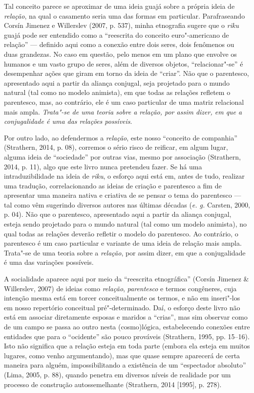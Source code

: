 Tal conceito parece se aproximar de uma ideia guajá sobre a própria
ideia de \emph{relação}, na qual o casamento seria uma das formas em
particular. Parafraseando Corsín Jimenez e Willerslev (2007, p. 537),
minha etnografia sugere que o \emph{riku} guajá pode ser entendido como
a ``reescrita do conceito euro"-americano de relação'' --- definido aqui como
a conexão entre dois seres, dois fenômenos ou duas grandezas. No caso em
questão, pelo menos em um plano que envolve os humanos e um vasto grupo
de seres, além de diversos objetos, ``relacionar"-se'' é desempenhar ações
que giram em torno da ideia de ``criar''. Não que o parentesco,
apresentado aqui a partir da aliança conjugal, seja projetado para o
mundo natural (tal como no modelo animista), em que todas as relações
refletem o parentesco, mas, ao contrário, ele é um caso particular de
uma matriz relacional mais ampla. \emph{Trata"-se de uma teoria sobre a
relação, por assim dizer, em que a conjugalidade é uma das relações
possíveis}.

Por outro lado, ao defendermos a \emph{relação}, este nosso ``conceito
de companhia'' (Strathern, 2014, p. 08), corremos o sério risco de reificar,
em algum lugar, alguma ideia de ``sociedade'' por outras vias, mesmo por
associação (Strathern, 2014, p. 11), algo que este livro nunca pretendeu
fazer. Se há uma intraduzibilidade na ideia de \emph{riku}, o esforço
aqui está em, antes de tudo, realizar uma tradução, correlacionando as
ideias de criação e parentesco a fim de apresentar uma maneira nativa e
criativa de se pensar o tema do parentesco --- tal como vêm sugerindo
diversos autores nas últimas décadas (\emph{e. g.} Carsten, 2000, p. 04). Não que o
parentesco, apresentado aqui a partir da aliança conjugal, esteja sendo
projetado para o mundo natural (tal como um modelo animista), no qual
todas as relações deverão refletir o modelo do parentesco. Ao contrário,
o parentesco é um caso particular e variante de uma ideia de relação
mais ampla. Trata"-se de uma teoria sobre a \emph{relação}, por assim
dizer, em que a conjugalidade é uma das variações possíveis.

A socialidade aparece aqui por meio da ``reescrita etnográfica'' (Corsín
Jimenez \& Willerslev, 2007) de ideias como \emph{relação},
\emph{parentesco} e termos congêneres, cuja intenção mesma está em
torcer conceitualmente os termos, e não em inseri"-los em nosso
repertório conceitual pré"-determinado. Daí, o esforço deste livro não
está em associar diretamente esposas e maridos a ``crias'', mas sim
observar como de um campo se passa ao outro nesta (cosmo)lógica,
estabelecendo conexões entre entidades que para o ``ocidente'' são pouco
prováveis (Strathern, 1995, pp. 15--16). Isto não significa que a relação
esteja em toda parte (embora ela esteja em muitos lugares, como venho
argumentando), mas que quase sempre aparecerá de certa maneira para
alguém, impossibilitando a existência de um ``espectador absoluto'' (Lima,
2005, p. 88), quando penetra em diversos níveis de realidade por um processo
de construção autossemelhante (Strathern, 2014 {[}1995{]}, p. 278).

